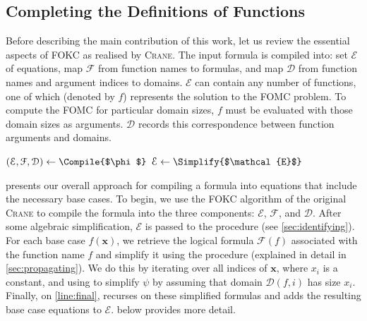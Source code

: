 \documentclass[a4paper,UKenglish,cleveref, autoref, thm-restate]{lipics-v2021}
\begin{document}
\subsection{Completing the Definitions of Functions}\label{sec:completing}

Before describing the main contribution of this work, let us review the
essential aspects of FOKC as realised by \textsc{Crane}. The input formula is
compiled into: set $\mathcal{E}$ of equations, map $\mathcal{F}$ from function
names to formulas, and map $\mathcal{D}$ from function names and argument
indices to domains. $\mathcal{E}$ can contain any number of functions, one of
which (denoted by $f$) represents the solution to the FOMC problem. To compute
the FOMC for particular domain sizes, $f$ must be evaluated with those domain
sizes as arguments. $\mathcal{D}$ records this correspondence between function
arguments and domains.

\begin{algorithm}[t]
  \caption{\protect\CompileWithBaseCases{$\phi$}}\label{alg:compilewithbasecases}
  $(\mathcal{E}, \mathcal{F}, \mathcal{D}) \gets \Compile{$\phi$}$\;
  $\mathcal{E} \gets \Simplify{$\mathcal{E}$}$\;\label{line:second}
\end{algorithm}

 presents our overall approach for compiling a
formula into equations that include the necessary base cases. To begin, we use
the FOKC algorithm of the original \textsc{Crane} to compile the formula into
the three components: $\mathcal{E}$, $\mathcal{F}$, and $\mathcal{D}$. After
some algebraic simplification, $\mathcal{E}$ is passed to the \FindBaseCases
procedure (see \cref{sec:identifying}). For each base case $f(\mathbf{x})$, we
retrieve the logical formula $\mathcal{F}(f)$ associated with the function name
$f$ and simplify it using the \Propagate procedure (explained in detail in
\cref{sec:propagating}). We do this by iterating over all indices of
$\mathbf{x}$, where $x_{i}$ is a constant, and using \Propagate to simplify
$\psi$ by assuming that domain $\mathcal{D}(f, i)$ has size $x_{i}$. Finally, on
\autoref{line:final}, \CompileWithBaseCases recurses on these simplified
formulas and adds the resulting base case equations to $\mathcal{E}$.
 below provides more detail.
\end{document}
